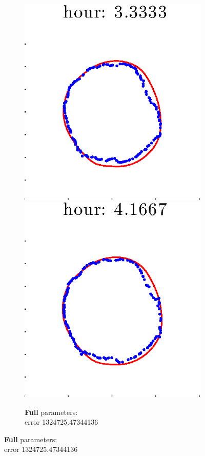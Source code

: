 \documentclass[12pt]{article}
\begin{document}
\begin{figure}[h!]
\begin{subfigure}[b]{.3\textwidth}
		\includegraphics[height=.15\textheight]{Pos0/firsthalf/full5.eps}
		\includegraphics[height=.15\textheight]{Pos0/firsthalf/full6.eps}
		\caption{\textbf{Full} parameters: \\error 1324725.47344136}

\end{subfigure}
\end{figure}
\end{document}
